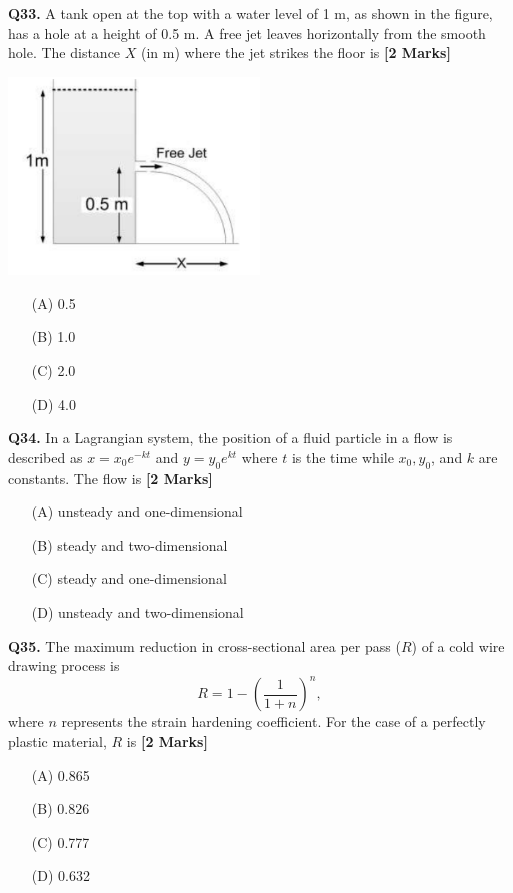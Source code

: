 \documentclass[11pt]{article}
\newcommand{\questionb}[2]{
    \noindent\textbf{Q#2.} #1 \hfill \textbf{[2 Marks]}
}
\begin{document}
\questionb{A tank open at the top with a water level of 1 m, as shown in the figure, has a hole at a height of 0.5 m. A free jet leaves horizontally from the smooth hole. The distance \( X \) (in m) where the jet strikes the floor is}{33}
\begin{center}
\includegraphics[width=0.5\textwidth]{figures/33.png}
\end{center}
\begin{enumerate}
    \item[(A)] 0.5
    \item[(B)] 1.0
    \item[(C)] 2.0
    \item[(D)] 4.0
\end{enumerate}
\vspace{0.5cm}

\questionb{In a Lagrangian system, the position of a fluid particle in a flow is described as \( x = x_0 e^{-kt} \) and \( y = y_0 e^{kt} \) where \( t \) is the time while \( x_0, y_0 \), and \( k \) are constants. The flow is}{34}
\begin{enumerate}
    \item[(A)] unsteady and one-dimensional
    \item[(B)] steady and two-dimensional
    \item[(C)] steady and one-dimensional
    \item[(D)] unsteady and two-dimensional
\end{enumerate}
\vspace{0.5cm}

\questionb{The maximum reduction in cross-sectional area per pass (\( R \)) of a cold wire drawing process is 
\[
R = 1 - \left( \frac{1}{1 + n} \right)^{n},
\]
where \( n \) represents the strain hardening coefficient. For the case of a perfectly plastic material, \( R \) is}{35}
\begin{enumerate}
    \item[(A)] 0.865
    \item[(B)] 0.826
    \item[(C)] 0.777
    \item[(D)] 0.632
\end{enumerate}
\vspace{0.5cm}
\end{document}
